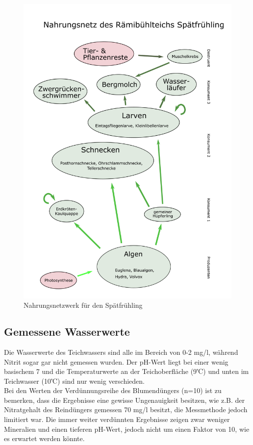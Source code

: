 \documentclass{article}
\begin{document}
            \begin{figure}[H]
            \centering
            \includegraphics[scale=0.75]{NewNetz2.png}
            \caption{Nahrungsnetzwerk für den Spätfrühling}
            \label{fig:universe}
            \end{figure}
            
            \newpage
        
    \subsection{Gemessene Wasserwerte}

        Die Wasserwerte des Teichwassers sind alle im Bereich von 0-2 mg/l, während Nitrit sogar gar nicht gemessen wurden. Der pH-Wert liegt bei einer wenig basischem 7 und die Temperaturwerte an der Teichoberfläche (9℃) und unten im Teichwasser (10℃) sind nur wenig verschieden. \\
        Bei den Werten der Verdünnungsreihe des Blumendüngers (n=10) ist zu bemerken, dass die Ergebnisse eine gewisse Ungenauigkeit besitzen, wie z.B. der Nitratgehalt des Reindüngers gemessen 70 mg/l besitzt, die Messmethode jedoch limitiert war. Die immer weiter verdünnten Ergebnisse zeigen zwar weniger Mineralien und einen tieferen pH-Wert, jedoch nicht um einen Faktor von 10, wie es erwartet werden könnte.
        
\end{document}
